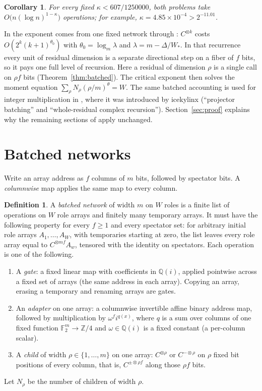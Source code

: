 \documentclass[11pt]{article}
\newtheorem{corollary}[theorem]{Corollary}
\theoremstyle{definition}
\newtheorem{definition}[theorem]{Definition}
\newcommand{\F}{\mathbb F}
\begin{document}
\begin{corollary}
For every fixed $\kappa<607/1250000$, both problems take
$O\bigl(n(\log n)^{1-\kappa}\bigr)$ operations; for example,
$\kappa=4.85\times10^{-4}>2^{-11.01}$.
\end{corollary}

In \cite{oai-dft} the exponent comes from one fixed network through
\cite[Theorem~2.6]{oai-dft}: $C^{\otimes k}$ costs $O(2^k(k+1)^{\theta_0})$
with $\theta_0=\log_m\lambda$ and $\lambda=m-\Delta/W_*$. In that recurrence every
unit of residual dimension is a separate directional step on a fiber of $f$
bits, so it pays one full level of recursion. Here a residual of dimension
$\rho$ is a single call on $\rho f$ bits (Theorem~\ref{thm:batched}). The
critical exponent then solves the moment equation
$\sum_\rho N_\rho(\rho/m)^\theta=W$. The same batched accounting is used for
integer multiplication in \cite{cms}, where it was introduced by icekylinx
(``projector batching'' and ``whole-residual complex recursion'').
Section~\ref{sec:proof} explains why the remaining sections of \cite{oai-dft}
apply unchanged.

\section{Batched networks}
Write an array address as $f$ columns of $m$ bits, followed by spectator bits.
A \emph{columnwise} map applies the same map to every column.

\begin{definition}\label{def:network}
A \emph{batched network} of width $m$ on $W$ roles is a finite list of
operations on $W$ role arrays and finitely many temporary arrays. It must have
the following property for every $f\ge1$ and every spectator set: for arbitrary
initial role arrays $A_1,\dots,A_W$, with temporaries starting at zero, the list
leaves every role array equal to $C^{\otimes mf}A_w$, tensored with the
identity on spectators. Each operation is one of the following.
\begin{enumerate}
\item A \emph{gate}: a fixed linear map with coefficients in
  $\mathbb Q(i)$, applied pointwise across a fixed set of arrays (the same
  address in each array). Copying an array, erasing a temporary and renaming
  arrays are gates.
\item An \emph{adapter} on one array: a columnwise invertible affine binary
  address map, followed by multiplication by $\omega^f i^{q(x)}$, where $q$ is a
  sum over columns of one fixed function $\F_2^m\to\mathbb Z/4$ and
  $\omega\in\mathbb Q(i)$ is a fixed constant (a per-column scalar).
\item A \emph{child} of width $\rho\in\{1,\dots,m\}$ on one array: $C^{\otimes\rho}$
  or $C^{-\otimes\rho}$ on $\rho$ fixed bit positions of every column, that is,
  $C^{\pm\otimes\rho f}$ along those $\rho f$ bits.
\end{enumerate}
Let $N_\rho$ be the number of children of width $\rho$.
\end{definition}
\end{document}
